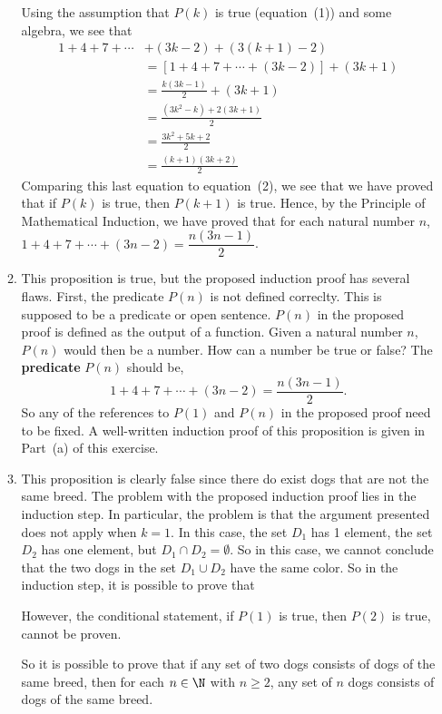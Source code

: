 \begin{enumerate}
\begin{enumerate}
\begin{myproof}
\noindent
Using the assumption that $P(k)$ is true (equation~(1)) and some algebra, we see that
\begin{align*}
1 + 4 + 7 + \cdots &+ ( 3k - 2 ) + \left( 3 (k + 1) - 2 \right) \\
  &= 
\left[ 1 + 4 + 7 + \cdots + ( 3k - 2 ) \right] + (3k + 1) \\
    &= \frac{k(3k - 1)}{2} + (3k + 1) \\
    &= \frac{(3k^2 - k) + 2(3k + 1)}{2} \\
    &= \frac{3k^2 + 5k + 2}{2} \\
    &= \frac{(k + 1)(3k + 2)}{2}
\end{align*}
Comparing this last equation to equation~(2), we see that we have proved that if $P(k)$ is true, then $P(k + 1)$ is true.  Hence, by the Principle of Mathematical Induction, we have proved that for each natural number $n$, $1 + 4 + 7 + \cdots + \left( 3n - 2 \right) = 
\dfrac{n \left(3n - 1 \right)}{2}$.
\end{myproof}

\item This proposition is true, but the proposed induction proof has several flaws.  First, the predicate $P(n)$ is not defined correclty.  This is supposed to be a predicate or open sentence.  $P(n)$ in the proposed proof is defined as the output of a function.  Given a natural number $n$, $P(n)$ would then be a number.  How can a number be true or false?  The 
\textbf{predicate} $P(n)$ should be,
\[
1 + 4 + 7 + \cdots + \left( 3n - 2 \right) = \frac{n(3n - 1)}{2}.
\]
So any of the references to $P(1)$ and $P(n)$ in the proposed proof need to be fixed.  A  well-written induction proof of this proposition is given in Part~(a) of this exercise.


\item This proposition is clearly false since there do exist dogs that are not the same breed.  The problem with the proposed induction proof lies in the induction step.  In particular, the problem is that the argument presented does not apply when $k = 1$.  In this case, the set $D_1$ has 1 element, the set $D_2$ has one element, but $D_1 \cap D_2 = \emptyset$.  So in this case, we cannot conclude that the two dogs in the set $D_1 \cup D_2$ have the same color.  So in the induction step, it is possible to prove that


\vskip6pt
\noindent
However, the conditional statement, if $P(1)$ is true, then $P(2)$ is true, cannot be proven.

\vskip6pt
\noindent
So it is possible to prove that if any set of two dogs consists of dogs of the same breed, then for each $n \in \N$ with $n \geq 2$, any set of $n$ dogs consists of dogs of the same breed.
\end{enumerate}
\end{enumerate}


